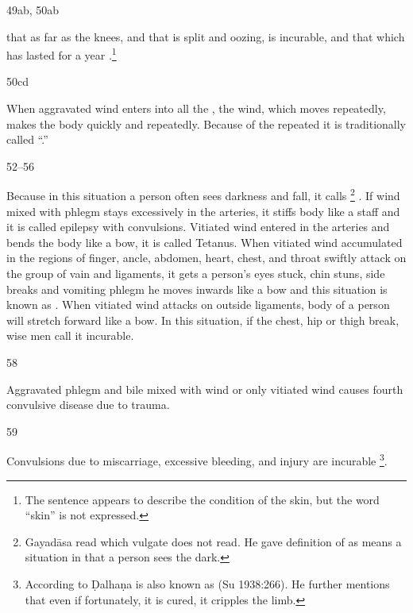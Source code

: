 \begin{translation}
\item[49ab, 50ab]

 that  as far as
the knees, and that is split and oozing, is incurable, and that which
has lasted for a year .\footnote{The
    sentence appears to describe the condition of the skin, but the word
    “skin” is not expressed.}
  

\item[50cd]

When aggravated wind enters into all the , the
wind, which moves repeatedly, makes the body 
quickly and repeatedly. Because of the repeated
 it is traditionally called “.”



\item[52--56]

	Because in this situation a person often sees darkness and fall, it
	calls  \footnote{Gayadāsa read 
	 which vulgate does not read.  He gave definition of  as 	 means a situation in that a person sees the dark.} . 
	If wind mixed with phlegm stays
	excessively in the arteries, it stiffs body like a staff and it is
	called  epilepsy with convulsions. Vitiated wind entered
	in the arteries and bends the body like a bow, it is called
	 Tetanus. When vitiated wind accumulated in the regions of
	finger, ancle, abdomen, heart, chest, and throat swiftly attack on the
	group of vain and ligaments, it gets a person’s eyes stuck, chin stuns,
	side breaks and vomiting phlegm he moves inwards like a bow and this
	situation is known as . When vitiated
	wind attacks on outside ligaments, body of a person will stretch forward
	like a bow. In this situation, if the chest, hip or thigh break, wise
	men call it incurable.

\item[58]

	Aggravated phlegm and bile mixed with wind or only vitiated wind causes
	fourth convulsive disease due to trauma.

\item[59]

	Convulsions due to miscarriage, excessive bleeding, and injury are
	incurable \footnote{According to Ḍalhaṇa  is
	also known as  (Su 1938:266). He further mentions that even
	if fortunately, it is cured, it cripples the limb.}.


\end{translation}
